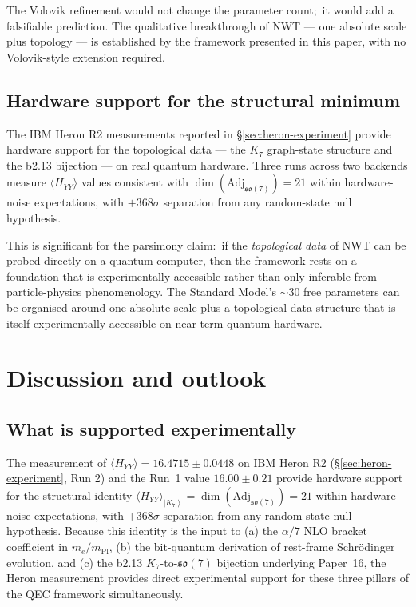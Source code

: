 \documentclass[11pt]{article}
\newcommand{\so}{\mathfrak{so}}
\newcommand{\Adj}{\mathrm{Adj}}
\newcommand{\ket}[1]{\left|#1\right\rangle}
\newcommand{\mPl}{m_{\mathrm{Pl}}}
\begin{document}
The Volovik refinement would not change the parameter count;\ it
would add a falsifiable prediction.  The qualitative breakthrough
of NWT --- one absolute scale plus topology --- is established by
the framework presented in this paper, with no Volovik-style
extension required.

\subsection{Hardware support for the structural minimum}
\label{sec:hardware-verifies-minimum}

The IBM Heron R2 measurements reported in
\S\ref{sec:heron-experiment} provide hardware support for the
topological data --- the $K_7$ graph-state structure and the b2.13
bijection --- on real quantum hardware.  Three runs across two
backends measure $\langle H_{YY}\rangle$ values consistent with
$\dim(\Adj_{\so(7)}) = 21$ within hardware-noise expectations,
with $+368\sigma$ separation from any random-state null hypothesis.

This is significant for the parsimony claim:\ if the
\emph{topological data} of NWT can be probed directly on a
quantum computer, then the framework rests on a foundation that is
experimentally accessible rather than only inferable from
particle-physics phenomenology.  The Standard Model's
$\sim 30$ free parameters can be organised around one absolute
scale plus a topological-data structure that is itself
experimentally accessible on near-term quantum hardware.

\section{Discussion and outlook}
\label{sec:discussion}

\subsection{What is supported experimentally}
\label{sec:what-verified}

The measurement of $\langle H_{YY}\rangle = 16.4715 \pm 0.0448$ on
IBM Heron R2 (\S\ref{sec:heron-experiment}, Run 2) and the
Run~1 value $16.00 \pm 0.21$ provide hardware support for the
structural identity
$\langle H_{YY}\rangle_{\ket{K_7}} = \dim(\Adj_{\so(7)}) = 21$
within hardware-noise expectations, with $+368\sigma$ separation
from any random-state null hypothesis.  Because this identity is the
input to (a) the $\alpha/7$ NLO bracket coefficient in $m_e/\mPl$,
(b) the bit-quantum derivation of rest-frame Schr\"odinger
evolution, and (c) the b2.13 $K_7$-to-$\so(7)$ bijection underlying
Paper~16, the Heron measurement provides direct experimental support
for these three pillars of the QEC framework simultaneously.
\end{document}

